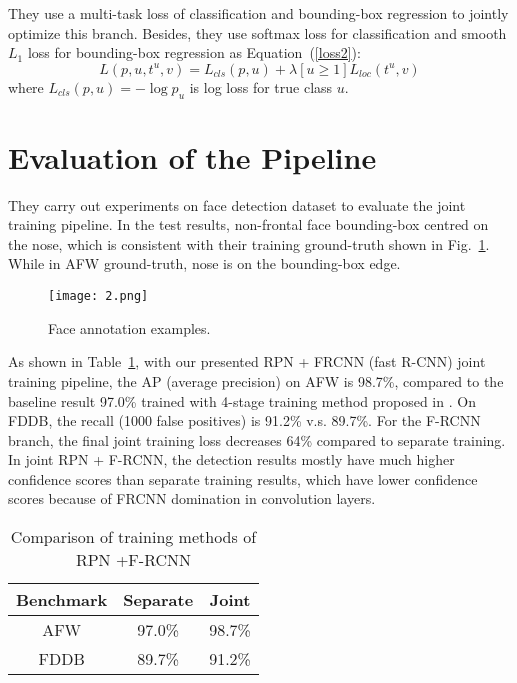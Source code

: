 \documentclass[twocolumn]{article}
\begin{document}
    They use a multi-task loss of classification and bounding-box regression to jointly optimize this branch. Besides, they use softmax loss for classification and smooth $L_1$ loss for bounding-box regression as Equation~(\ref{loss2}):
    \begin{equation}
    L(p,u,t^u,v)=L_{cls}(p,u)+\lambda [ u\ge 1 ] L_{loc}(t^u,v)    \label{loss2}
    \end{equation}
   where $L_{cls}(p,u)=-\log p_u$ is log loss for true class $u$.
   
   \section{Evaluation of the Pipeline}
   They carry out experiments on face detection dataset to evaluate the joint training pipeline. In the test results, non-frontal face bounding-box centred on the nose, which is consistent with their training ground-truth shown in Fig.~\ref{fig2}. While in AFW\cite{Zhu2012Face} ground-truth, nose is on the bounding-box edge.
   \begin{figure}[htbp] 
   	\begin{center} 
   		\texttt{[image: 2.png]} 
   		\caption{Face annotation examples.}\label{fig2}  
   	\end{center}   
   \end{figure}

   As shown in Table~\ref{Comparison}, with our presented RPN + FRCNN (fast R-CNN) joint training pipeline, the AP (average precision) on AFW is 98.7\%, compared to the baseline result 97.0\% trained with 4-stage training method proposed in \cite{Ren2017Faster}. On FDDB\cite{Jain2010FDDB}, the recall (1000 false positives) is 91.2\% v.s. 89.7\%. For the F-RCNN branch, the final joint training loss decreases 64\% compared to separate training. In joint RPN + F-RCNN, the detection results mostly have much higher confidence scores than separate training results, which have lower confidence scores because of FRCNN domination in convolution layers.
   \begin{table}[h]
   	\centering
   	\caption{Comparison of training methods of RPN +F-RCNN}\label{Comparison}
   	\begin{tabular}{|c|c|c|}
   		\hline
   		Benchmark&Separate& Joint \\
   		\hline
   		AFW  &97.0\% &98.7\%\\
   		\hline
   		FDDB  &89.7\% &91.2\%\\
   		\hline
   	\end{tabular}
   \end{table}
  

	
\end{document}
